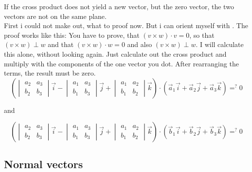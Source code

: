 \documentclass[a4paper]{article}
\begin{document}
If the cross product does not yield a new vector, but the  zero vector, the two vectors are not on the same plane.\\

First i could not make out, what to proof now. But i can orient myself with \cite{Corral1}. The proof works like this: You have to prove, that $(v \times w) \cdot v = 0$, so that $(v \times w) \perp w$ and that $(v \times w) \cdot w = 0$ and also $(v \times w) \perp w$. I will calculate this alone, without looking again. Just calculate out the cross product and multiply with the components of the one vector you dot. After rearranging the terms, the result must be zero.\\

\begin{displaymath}
\left(\begin{vmatrix}
a_2 & a_3 \\
b_2 & b_3 
\end{vmatrix} \vec{i} - \begin{vmatrix}a_1 & a_3\\ b_1 & b_3\end{vmatrix} \vec{j} + \begin{vmatrix}a_1 & a_2\\b_1 & b_2\end{vmatrix} \vec{k}\right) \cdot \left(\vec{a}_{1}\vec{i} + \vec{a}_{2}\vec{j} + \vec{a}_{3}\vec{k}\right) =\nolimits^{?} 0
\end{displaymath}

and

\begin{displaymath}
\left(\begin{vmatrix}
a_2 & a_3 \\
b_2 & b_3 
\end{vmatrix} \vec{i} - \begin{vmatrix}a_1 & a_3\\ b_1 & b_3\end{vmatrix} \vec{j} + \begin{vmatrix}a_1 & a_2\\b_1 & b_2\end{vmatrix} \vec{k}\right) \cdot \left(\vec{b}_{1}\vec{i} + \vec{b}_{2}\vec{j} + \vec{b}_{3}\vec{k}\right) =\nolimits^{?} 0
\end{displaymath}

\subsection{Normal vectors}
\end{document}
